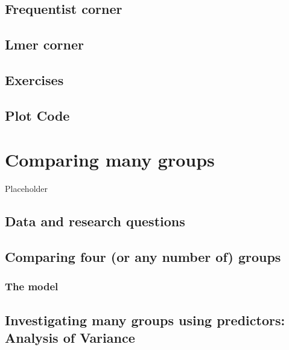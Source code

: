 \documentclass[
]{book}
\begin{document}
\hypertarget{frequentist-corner-1}{%
\section{Frequentist corner}\label{frequentist-corner-1}}

\hypertarget{lmer-corner}{%
\section{Lmer corner}\label{lmer-corner}}

\hypertarget{exercises-2}{%
\section{Exercises}\label{exercises-2}}

\hypertarget{plot-code-2}{%
\section{Plot Code}\label{plot-code-2}}

\hypertarget{comparing-many-groups}{%
\chapter{Comparing many groups}\label{comparing-many-groups}}

Placeholder

\hypertarget{data-and-research-questions-3}{%
\section{Data and research questions}\label{data-and-research-questions-3}}

\hypertarget{comparing-four-or-any-number-of-groups}{%
\section{Comparing four (or any number of) groups}\label{comparing-four-or-any-number-of-groups}}

\hypertarget{the-model}{%
\subsection{The model}\label{the-model}}

\hypertarget{investigating-many-groups-using-predictors-analysis-of-variance}{%
\section{Investigating many groups using predictors: Analysis of Variance}\label{investigating-many-groups-using-predictors-analysis-of-variance}}
\end{document}
